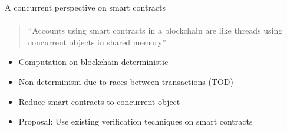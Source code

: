 
\begin{frame}{A concurrent perspective on smart
    contracts}
    \framesubtitle{\cite{bib:concurrent-perspective}}
    \begin{quote}
    ``Accounts using smart contracts in a blockchain are like threads using
    concurrent objects in shared memory''
    \end{quote}

    \begin{itemize}
        \item Computation on blockchain \alert{deterministic}
        \item \alert{Non-determinism} due to races between transactions (TOD)
        \item Reduce smart-contracts to concurrent object
        \item Proposal: Use existing verification techniques on smart contracts
    \end{itemize}

\end{frame}
